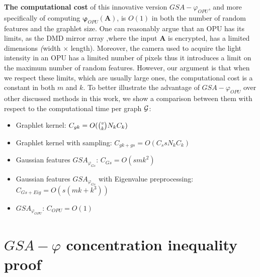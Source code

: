 \textbf{The computational cost} of this innovative version $GSA-\varphi_{OPU}$, and more specifically of computing $\boldsymbol{\varphi}_{OPU}(\mathbf{A})$, is $O(1)$ in both the number of random features and the graphlet size. One can reasonably argue that an OPU has its limits, as the DMD mirror array ,where the input $\mathbf{A}$ is encrypted, has a limited dimensions \emph(width $\times$ length). Moreover, the camera used to acquire the light intensity in an OPU has a limited number of pixels thus it introduces a limit on the maximum number of random features. However, our argument is that when we respect these limits, which are usually large ones, the computational cost is a constant in both $m$ and $k$. To better illustrate the advantage of $GSA-\varphi_{OPU}$ over other discussed methods in this work, we show a comparison between them with respect to the computational time per graph $\mathcal{G}$:
\begin{itemize}
    \item Graphlet kernel: $C_{gk}= O(\tbinom{v}{k} N_k C_k)$
    \item Graphlet kernel with sampling: $ C_{gk + gs}= O(C_s s N_k C_k)$
    \item Gaussian features $GSA_{\varphi_{Gs}}$: $C_{Gs}=O(smk^2)$
    \item Gaussian features  $GSA_{\varphi_{Gs}}$ with Eigenvalue preprocessing: $C_{Gs+Eig}=O(s(mk+k^3))$
    \item $GSA_{\varphi_{OPU}}$:  $C_{OPU}=O(1)$
\end{itemize}

\section{$GSA-\varphi$ concentration inequality proof}
\label{section:proof}

